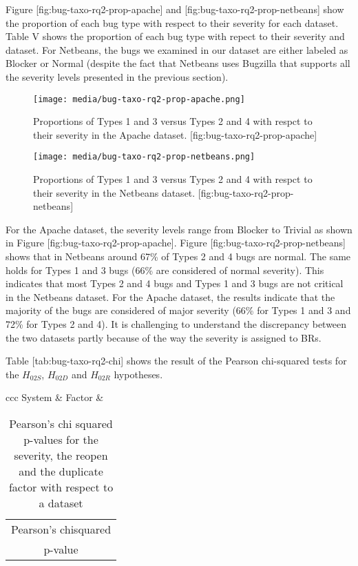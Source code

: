 Figure {[}fig:bug-taxo-rq2-prop-apache{]} and
{[}fig:bug-taxo-rq2-prop-netbeans{]} show the proportion of each bug
type with respect to their severity for each dataset. Table V shows the
proportion of each bug type with repect to their severity and dataset.
For Netbeans, the bugs we examined in our dataset are either labeled as
Blocker or Normal (despite the fact that Netbeans uses Bugzilla that
supports all the severity levels presented in the previous section).

\begin{figure}[htbp]
\centering
\texttt{[image: media/bug-taxo-rq2-prop-apache.png]}
\caption{Proportions of Types 1 and 3 versus Types 2 and 4 with respct
to their severity in the Apache dataset.
{[}fig:bug-taxo-rq2-prop-apache{]}}
\end{figure}

\begin{figure}[htbp]
\centering
\texttt{[image: media/bug-taxo-rq2-prop-netbeans.png]}
\caption{Proportions of Types 1 and 3 versus Types 2 and 4 with respct
to their severity in the Netbeans dataset.
{[}fig:bug-taxo-rq2-prop-netbeans{]}}
\end{figure}

For the Apache dataset, the severity levels range from Blocker to
Trivial as shown in Figure {[}fig:bug-taxo-rq2-prop-apache{]}. Figure
{[}fig:bug-taxo-rq2-prop-netbeans{]} shows that in Netbeans around 67\%
of Types 2 and 4 bugs are normal. The same holds for Types 1 and 3 bugs
(66\% are considered of normal severity). This indicates that most Types
2 and 4 bugs and Types 1 and 3 bugs are not critical in the Netbeans
dataset. For the Apache dataset, the results indicate that the majority
of the bugs are considered of major severity (66\% for Types 1 and 3 and
72\% for Types 2 and 4). It is challenging to understand the discrepancy
between the two datasets partly because of the way the severity is
assigned to BRs.

Table {[}tab:bug-taxo-rq2-chi{]} shows the result of the Pearson
chi-squared tests for the \(H_{02S}\), \(H_{02D}\) and \(H_{02R}\)
hypotheses.

{c\textbar{}c\textbar{}c} System \& Factor \&

\begin{longtable}[]{@{}c@{}}
\caption{Pearson's chi squared p-values for the severity, the reopen and
the duplicate factor with respect to a dataset{}}\tabularnewline
\toprule
Pearson's chisquared\tabularnewline
p-value\tabularnewline
\bottomrule
\end{longtable}


